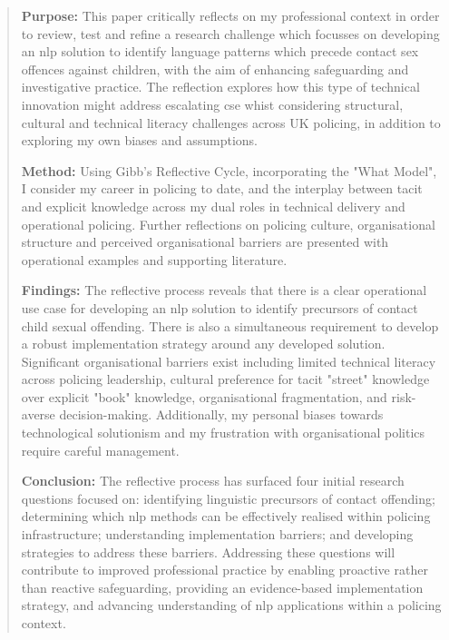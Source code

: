 \documentclass[12pt,a4paper,oneside]{report}
\begin{document}
\begin{abstract} %
\par \textbf{Purpose:} This paper critically reflects on my professional context in order to review, test and refine a research challenge which focusses on developing an \gls{nlp} solution to identify language patterns which precede contact sex offences against children, with the aim of enhancing safeguarding and investigative practice.  The reflection explores how this type of technical innovation might address escalating \gls{cse} whist considering structural, cultural and technical literacy challenges across UK policing, in addition to exploring my own biases and assumptions. 

\par \textbf{Method:} Using Gibb's Reflective Cycle, incorporating the "What Model", I consider my career in policing to date, and the interplay between tacit and explicit knowledge across my dual roles in technical delivery and operational policing.  Further reflections on policing culture, organisational structure and perceived organisational barriers are presented with operational examples and supporting literature. 

\par \textbf{Findings:} The reflective process reveals that there is a clear operational use case for developing an \gls{nlp} solution to identify precursors of contact child sexual offending.  There is also a simultaneous requirement to develop a robust implementation strategy around any developed solution. Significant organisational barriers exist including limited technical literacy across policing leadership, cultural preference for tacit "street" knowledge over explicit "book" knowledge, organisational fragmentation, and risk-averse decision-making.  Additionally, my personal biases towards technological solutionism and my frustration with organisational politics require careful management. 

\par \textbf{Conclusion:} The reflective process has surfaced four initial research questions focused on: identifying linguistic precursors of contact offending; determining which \gls{nlp} methods can be effectively realised within policing infrastructure; understanding implementation barriers; and developing strategies to address these barriers. Addressing these questions will contribute to improved professional practice by enabling proactive rather than reactive safeguarding, providing an evidence-based implementation strategy, and advancing understanding of \gls{nlp} applications within a policing context.
\end{abstract}
\end{document}
